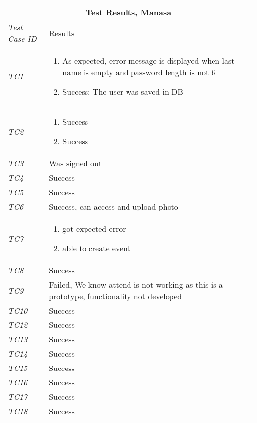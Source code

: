 %
\begin{minipage}{\linewidth}
\setlength{\tabcolsep}{15pt}
\centering
{}
\begin{tabular}{ |l|p{70mm}| }
	\hline
	\multicolumn{2}{|c|}{\cellcolor{gray!25} \textbf{Test Results, Manasa}} \\
	\hline
	\it{\cellcolor{gray!25}Test Case ID} & {\cellcolor{gray!25} Results } \\
	\hline
	\it{\cellcolor{gray!25}TC1} & \begin{enumerate}[label=\alph*)]
	                                \item As expected, error message is displayed when last name is empty and password length is not 6
	                                \item Success: The user was saved in DB
	                              \end{enumerate}\\ \hline
	\it{\cellcolor{gray!25}TC2} & \begin{enumerate}
	                                \item Success
	                                \item Success
	                              \end{enumerate}\\ \hline
	\it{\cellcolor{gray!25}TC3} & Was signed out \\ \hline
	\it{\cellcolor{gray!25}TC4} & Success \\ \hline
	\it{\cellcolor{gray!25}TC5} & Success \\ \hline
	\it{\cellcolor{gray!25}TC6} & Success, can access and upload photo  \\ \hline
	\it{\cellcolor{gray!25}TC7} & \begin{enumerate}[label=\alph*)]
	                                \item got expected error
	                                \item able to  create event
	                              \end{enumerate}\\ \hline
	\it{\cellcolor{gray!25}TC8} & Success \\ \hline
	\it{\cellcolor{gray!25}TC9} & Failed, We know attend is not working as this is a prototype, functionality not developed \\ \hline
	\it{\cellcolor{gray!25}TC10} & Success \\ \hline
	\it{\cellcolor{gray!25}TC12} & Success \\ \hline
	\it{\cellcolor{gray!25}TC13} & Success \\ \hline
	\it{\cellcolor{gray!25}TC14} & Success \\ \hline
	\it{\cellcolor{gray!25}TC15} & Success \\ \hline
	\it{\cellcolor{gray!25}TC16} & Success \\ \hline
	\it{\cellcolor{gray!25}TC17} & Success \\ \hline
	\it{\cellcolor{gray!25}TC18} & Success \\ \hline
\end{tabular}
\medskip
\end{minipage}